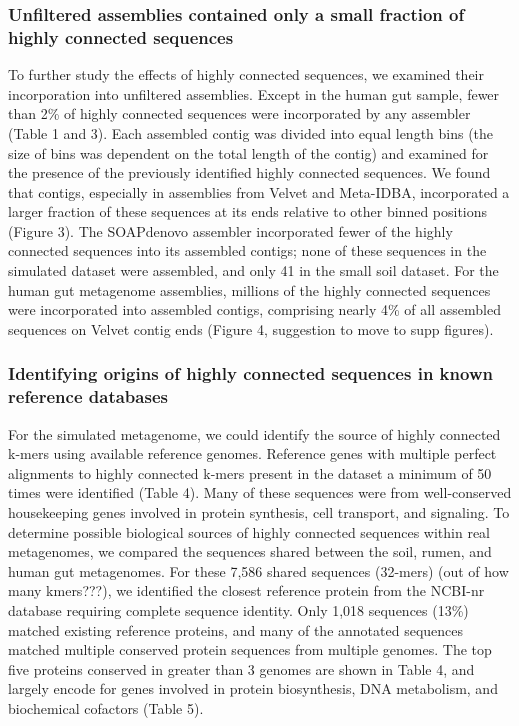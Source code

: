 \documentclass[10pt]{article}
\begin{document}
\subsubsection*{Unfiltered assemblies contained only a small fraction of highly connected sequences}
To further study the effects of highly connected sequences, we examined their incorporation into unfiltered assemblies.   Except in the human gut sample, fewer than 2\% of highly connected sequences were incorporated by any assembler (Table 1 and 3).  Each assembled contig was divided into equal length bins (the size of bins was dependent on the total length of the contig) and examined for the presence of the previously identified highly connected sequences.  We found that contigs, especially in assemblies from Velvet and Meta-IDBA, incorporated a larger fraction of these sequences at its ends relative to other binned positions (Figure 3).  The SOAPdenovo assembler incorporated fewer of the highly connected sequences into its assembled contigs; none of these sequences in the simulated dataset were assembled, and only 41 in the small soil dataset.  For the human gut metagenome assemblies, millions of the highly connected sequences were incorporated into assembled contigs, comprising nearly 4\% of all assembled sequences on Velvet contig ends (Figure 4, suggestion to move to supp figures).

\subsubsection*{Identifying origins of highly connected sequences in known reference databases}

For the simulated metagenome, we could identify the source of highly connected k-mers using available reference genomes. Reference genes with multiple perfect alignments to highly connected k-mers present in the dataset a minimum of 50 times were identified (Table 4).  Many of these sequences were from well-conserved housekeeping genes involved in protein synthesis, cell transport, and signaling.  To determine possible biological sources of highly connected sequences within real metagenomes, we compared the sequences shared between the soil, rumen, and human gut metagenomes.  For these 7,586 shared sequences (32-mers) (out of how many kmers???), we identified the closest reference protein from the NCBI-nr database requiring complete sequence identity.  Only 1,018 sequences (13\%) matched existing reference proteins, and many of the annotated sequences matched multiple conserved protein sequences from multiple genomes.  The top five proteins conserved in greater than 3 genomes are shown in Table 4, and largely encode for genes involved in protein biosynthesis, DNA metabolism, and biochemical cofactors (Table 5).
\end{document}

